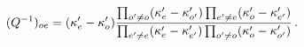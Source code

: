 \begin{equation}
(Q^{-1})_{oe}=(\kappa _{e}^{\prime }-\kappa _{o}^{\prime }){\frac{%
\prod_{o^{\prime }\neq o}(\kappa _{e}^{\prime }-\kappa _{o^{\prime
}}^{\prime })\prod_{e^{\prime }\neq e}(\kappa _{o}^{\prime }-\kappa
_{e^{\prime }}^{\prime })}{\prod_{e^{\prime }\neq e}(\kappa _{e}^{\prime
}-\kappa _{e^{\prime }}^{\prime })\prod_{o^{\prime }\neq o}(\kappa
_{o}^{\prime }-\kappa _{o^{\prime }}^{\prime })}}\,.
\end{equation}

